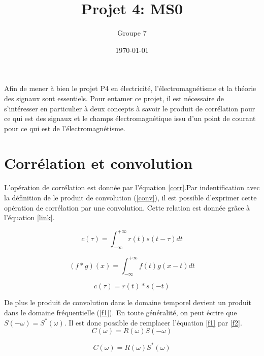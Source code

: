 \documentclass[10pt,a4paper]{article}
\begin{document}
\title{Projet 4: MS0}
\date\today
\author{Groupe 7}
\maketitle

Afin de mener à bien le projet P4 en électricité, l'électromagnétisme et la théorie des signaux sont essentiels. Pour entamer ce projet, il est nécessaire de s'intéresser en particulier à deux concepts à savoir le produit de corrélation pour ce qui est des signaux et le champs électromagnétique issu d'un point de courant pour ce qui est de l'électromagnétisme.

\section{Corrélation et convolution}
	L'opération de corrélation est donnée par l'équation \ref{corr}.Par indentification avec la définition de le produit de convolution (\ref{conv}), il est possible d'exprimer cette opération de corrélation par une convolution. Cette relation est donnée grâce à l'équation \ref{link}.

	\begin{equation}
		c(\tau) = \int _{-\infty}^{+\infty} r(t)s(t-\tau) dt
        \label{corr}
	\end{equation}

	\begin{equation}
		(f*g)(x) = \int _{-\infty}^{+\infty} f(t)g(x-t)dt
        \label{conv}
	\end{equation}
	
	\begin{equation}
		c(\tau) = r(t)*s(-t)
        \label{link}
	\end{equation}
	
	De plus le produit de convolution dans le domaine temporel devient un produit dans le domaine fréquentielle (\ref{f1}). 
En toute généralité, on peut écrire que $S(-\omega)=S^*(\omega)$. Il est donc possible de remplacer l'équation \ref{f1} par \ref{f2}.
	\begin{equation}
		C(\omega) = R(\omega)S(-\omega)
        \label{f1}
	\end{equation}
    
    \begin{equation}
		C(\omega) = R(\omega)S^*(\omega)
        \label{f2}
	\end{equation}
    
    
\end{document}
